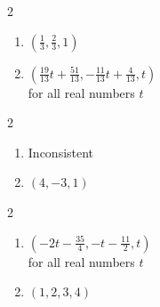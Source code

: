\documentclass{ximera}
\begin{document}
\begin{multicols}{2}
\begin{enumerate}
\setcounter{enumi}{\value{HW}}



\item  $\left(\frac{1}{3},\frac{2}{3},1\right)$
\item  $\left(\frac{19}{13} t + \frac{51}{13},-\frac{11}{13} t+\frac{4}{13},t\right)$\\
for all real numbers $t$

\setcounter{HW}{\value{enumi}}
\end{enumerate}
\end{multicols}


\begin{multicols}{2}
\begin{enumerate}
\setcounter{enumi}{\value{HW}}

\item Inconsistent
\item $\left(4,-3,1\right)$

\setcounter{HW}{\value{enumi}}
\end{enumerate}
\end{multicols}


\begin{multicols}{2}
\begin{enumerate}
\setcounter{enumi}{\value{HW}}


\item $\left(-2t - \frac{35}{4},-t - \frac{11}{2},t\right)$\\
for all real numbers $t$
\item $(1, 2, 3, 4)$

\setcounter{HW}{\value{enumi}}
\end{enumerate}
\end{multicols}
\end{document}
